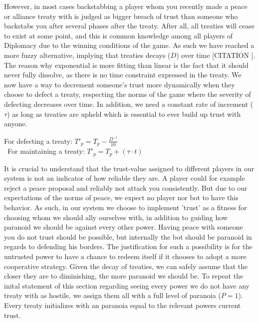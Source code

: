 \documentclass[a4paper]{article} %
\begin{document}
However, in most cases backstabbing a player whom you recently made a peace or alliance treaty with is judged as bigger breach of trust than someone who backstabs you after several phases after the treaty. After all, all treaties will cease to exist at some point, and this is common knowledge among all players of Diplomacy due to the winning conditions of the game. As such we have reached a more fuzzy alternative, implying that treaties decays ($D$) over time [CITATION ]. The reason why exponential is more fitting than linear is the fact that it should never fully dissolve, as there is no time constraint expressed in the treaty. We now have a way to decrement someone's trust  more dynamically when they choose to defect a treaty, respecting the norms of the game where the severity of defecting decreases over time. In addition, we need a constant rate of increment ($\tau$) as long as treaties are upheld which is essential to ever build up trust with anyone.\

For defecting a treaty: 
$T'_p = T_p - \frac{D^{-t}} {10}$ \\
\
For maintaining a treaty: 
$T'_p = T_p + (\tau \cdot t)$
\\
 \begin{center}
\end{center}

It is crucial to understand that the trust-value assigned to different players in our system is not an indicator of how reliable they are. A player could for example reject a peace proposal and reliably not attack you consistently. But due to our expectations of the norms of peace, we expect no player nor bot to have this behavior. As such, in our system we choose to implement 'trust' as a fitness for choosing whom we should ally ourselves with, in addition to guiding how paranoid we should be against every other power. Having peace with someone you do not trust should be possible, but internally the bot should be paranoid in regards to defending his borders. The justification for such a possibility is for the untrusted power to have a chance to redeem itself if it chooses to adopt a more cooperative strategy. Given the decay of treaties, we can safely assume that the closer they are to diminishing, the more paranoid we should be. To repeat the inital statement of this section regarding seeing every power we do not have any treaty with as hostile, we assign them all with a full level of paranoia ($P = 1$). Every treaty initializes with an paranoia equal to the relevant powers current trust. 
\end{document}
